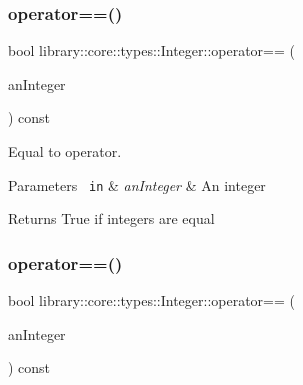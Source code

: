 \subsubsection{\texorpdfstring{operator==()}{operator==()}\hspace{0.1cm}{\footnotesize\ttfamily [1/2]}}
{\footnotesize\ttfamily bool library\+::core\+::types\+::\+Integer\+::operator== (\begin{DoxyParamCaption}\item[{const \mbox{\hyperlink{classlibrary_1_1core_1_1types_1_1_integer}{Integer}} \&}]{an\+Integer }\end{DoxyParamCaption}) const}



Equal to operator. 


\begin{DoxyCode}{0}
\end{DoxyCode}



\begin{DoxyParams}[1]{Parameters}
\mbox{\texttt{ in}}  & {\em an\+Integer} & An integer \\
\hline
\end{DoxyParams}
\begin{DoxyReturn}{Returns}
True if integers are equal 
\end{DoxyReturn}
\mbox{\label{classlibrary_1_1core_1_1types_1_1_integer_a02858e726140a9e84281699a41675081}} 
\subsubsection{\texorpdfstring{operator==()}{operator==()}\hspace{0.1cm}{\footnotesize\ttfamily [2/2]}}
{\footnotesize\ttfamily bool library\+::core\+::types\+::\+Integer\+::operator== (\begin{DoxyParamCaption}\item[{const \mbox{\hyperlink{classlibrary_1_1core_1_1types_1_1_integer_a623afb1580f870fd8a1997b1c12c917d}{Integer\+::\+Value\+Type}} \&}]{an\+Integer }\end{DoxyParamCaption}) const}



